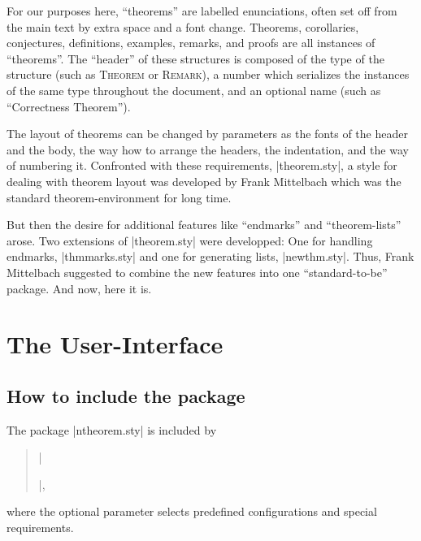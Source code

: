 \documentclass{ltxdoc}
\theoremstyle{marginbreak}
\theoremstyle{changebreak}
\theoremstyle{change}
\theoremstyle{plain}
\theoremstyle{nonumberplain}
\begin{document}
For our purposes here, ``theorems'' are labelled enunciations,
often set off from the main text by extra space and a font change.
Theorems, corollaries, conjectures, definitions, examples, 
remarks, and proofs are all instances of ``theorems''.  
The ``header'' of 
these structures is composed of the type of the structure 
(such as \textsc{Theorem} or \textsc{Remark}), a number 
which serializes the instances of the same type throughout the
document, and an optional name (such as ``Correctness Theorem'').

The layout of theorems can be changed by parameters as the fonts
of the header and the body, the way how to arrange the headers,
the indentation, and the way of numbering it.
Confronted with these requirements, |theorem.sty|, a style for 
dealing with theorem layout was developed by Frank Mittelbach
which was the standard theorem-environment for long time.

But then the desire for additional features like ``endmarks''
and ``theorem-lists'' arose. 
Two extensions of |theorem.sty| were developped: One for handling 
endmarks, |thmmarks.sty| and one for generating lists, |newthm.sty|. 
Thus, Frank Mittelbach suggested to combine the new features into 
one ``standard-to-be'' package. 
And now, here it is.

\section{The User-Interface}
\subsection{How to include the package}

The package |ntheorem.sty| is included by
\begin{quote}
|\usepackage[||]{ntheorem.sty}|,
\end{quote}
where the optional parameter  selects predefined
configurations and special requirements. 
\end{document}
